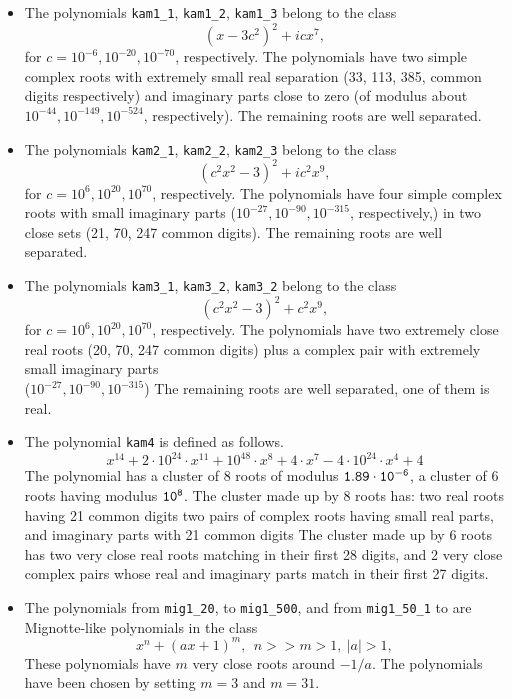 \documentclass{article}
\begin{document}
\begin{itemize}
\item
The polynomials {\tt kam1\_1}, {\tt kam1\_2}, {\tt kam1\_3} belong to the
class
\[
(x-3c^2)^2+icx^7,
\]
for $c=10^{-6}, 10^{-20}, 10^{-70}$, respectively.  
The polynomials have two simple
complex roots with extremely small real separation (33, 113, 385,
common digits respectively) and imaginary parts close to zero (of
modulus about $10^{-44}, 10^{-149}, 10^{-524}$, respectively).  The
remaining roots are well separated.
\item
The polynomials {\tt kam2\_1}, {\tt kam2\_2}, {\tt kam2\_3} belong to the
class
\[
    (c^2x^2-3)^2+ic^2x^9,
\]
for $c=10^{6}, 10^{20}, 10^{70}$, respectively.  
The polynomials have four simple
complex roots with small imaginary parts ($10^{-27},
10^{-90},10^{-315}$, respectively,) in two close sets (21, 70, 247
common digits).
The remaining roots are well separated.

\item
The polynomials {\tt kam3\_1}, {\tt kam3\_2}, {\tt kam3\_2} belong to the
class
\[
    (c^2x^2-3)^2+c^2x^9,
\]
for $c=10^{6}, 10^{20}, 10^{70}$, respectively.
The polynomials have two extremely close real roots (20, 70, 247
common digits) plus a complex pair with extremely small imaginary
parts \\
($10^{-27}, 10^{-90}, 10^{-315}$)
The remaining roots are well separated, one of them is real.

\item
The polynomial {\tt kam4} is defined as follows.
\[
   x^{14}+2 \cdot 10^{24}\cdot x^{11}+10^{48}\cdot x^8+4 \cdot x^7-4
   \cdot10^{24}\cdot x^4+4
\]
The polynomial has a cluster of 8 roots of modulus $\tt 1.89\cdot
10^{-6}$, a cluster of 6 roots having modulus $\tt 10^8$. The cluster
made up by 8 roots has: two real roots having 21 common digits
two pairs of complex roots having small real parts, and imaginary
parts with 21 common digits
The cluster made up by 6 roots has two very close real roots matching
in their first 28 digits, and 2 very close complex pairs whose real
and imaginary parts match in their first 27 digits.

\item The polynomials from {\tt mig1\_20}, to {\tt mig1\_500},
and from {\tt mig1\_50\_1} to are Mignotte-like
polynomials in the class                  
\[
    x^n+(a x+1)^m, \ \ n>>m>1, \ |a|>1,
\]
These polynomials have $m$ very close roots around $-1/a$. 
The polynomials have been chosen by setting $m=3$ and $m=31$. 



\end{itemize}
\end{document}
